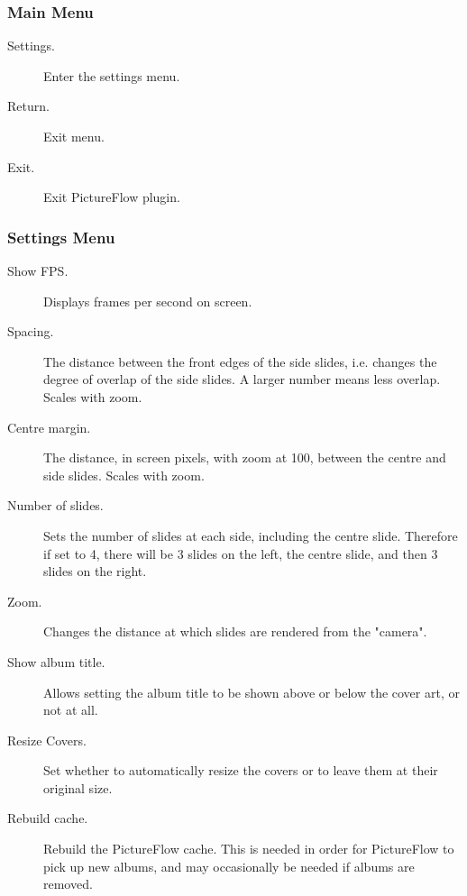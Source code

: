 \subsubsection{Main Menu}
\begin{description}
  \item[Settings.] Enter the settings menu.
  \item[Return.] Exit menu.
  \item[Exit.] Exit PictureFlow plugin.
\end{description}

\subsubsection{Settings Menu}

\begin{description}
  \item[Show FPS.] Displays frames per second on screen.
  \item[Spacing.] The distance between the front edges of the side slides, i.e. changes
  the degree of overlap of the side slides. A larger number means less overlap. Scales with zoom.
  \item[Centre margin.] The distance, in screen pixels, with zoom at 100, between
  the centre and side slides. Scales with zoom.
  \item[Number of slides.] Sets the number of slides at each side, including the
  centre slide. Therefore if set to 4, there will be 3 slides on the left,
  the centre slide, and then 3 slides on the right.
  \item[Zoom.] Changes the distance at which slides are rendered from the "camera".
  \item[Show album title.] Allows setting the album title to be shown above or
  below the cover art, or not at all.
  \item[Resize Covers.] Set whether to automatically resize the covers or to leave
  them at their original size.
  \item[Rebuild cache.] Rebuild the PictureFlow cache. This is needed in order
  for PictureFlow to pick up new albums, and may occasionally be needed if albums
  are removed.
\end{description}
